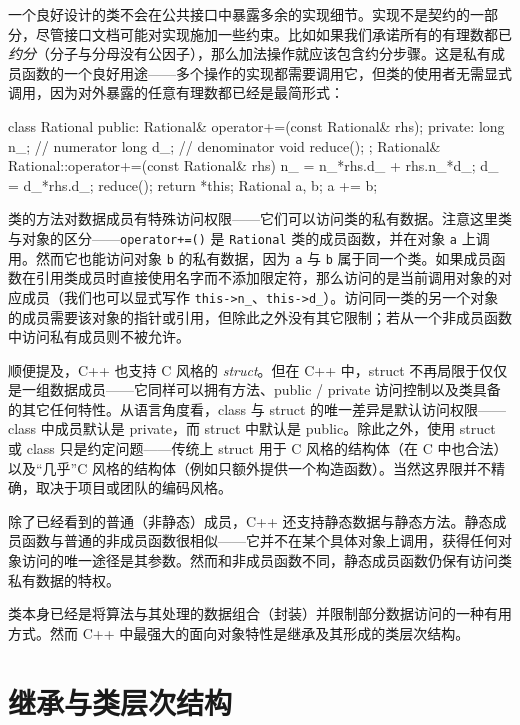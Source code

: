 一个良好设计的类不会在公共接口中暴露多余的实现细节。实现不是契约的一部分，尽管接口文档可能对实现施加一些约束。比如如果我们承诺所有的有理数都已\emph{约分}（分子与分母没有公因子），那么加法操作就应该包含约分步骤。这是私有成员函数的一个良好用途——多个操作的实现都需要调用它，但类的使用者无需显式调用，因为对外暴露的任意有理数都已经是最简形式：

\begin{code}
class Rational {
  public:
  Rational& operator+=(const Rational& rhs); private:
  long n_; // numerator
  long d_; // denominator
  void  reduce();
};
Rational& Rational::operator+=(const Rational& rhs) {
  n_ = n_*rhs.d_ + rhs.n_*d_;
  d_ = d_*rhs.d_; reduce();
  return *this;
}
Rational a, b; a += b;
\end{code}

类的方法对数据成员有特殊访问权限——它们可以访问类的私有数据。注意这里类与对象的区分——\texttt{operator+=()} 是 \texttt{Rational} 类的成员函数，并在对象 \texttt{a} 上调用。然而它也能访问对象 \texttt{b} 的私有数据，因为 \texttt{a} 与 \texttt{b} 属于同一个类。如果成员函数在引用类成员时直接使用名字而不添加限定符，那么访问的是当前调用对象的对应成员（我们也可以显式写作 \texttt{this-\textgreater{}n\_}、\texttt{this-\textgreater{}d\_}）。访问同一类的另一个对象的成员需要该对象的指针或引用，但除此之外没有其它限制；若从一个非成员函数中访问私有成员则不被允许。

顺便提及，C++ 也支持 C 风格的 \emph{struct}。但在 C++ 中，struct 不再局限于仅仅是一组数据成员——它同样可以拥有方法、public / private 访问控制以及类具备的其它任何特性。从语言角度看，class 与 struct 的唯一差异是默认访问权限——class 中成员默认是 private，而 struct 中默认是 public。除此之外，使用 struct 或 class 只是约定问题——传统上 struct 用于 C 风格的结构体（在 C 中也合法）以及“几乎”C 风格的结构体（例如只额外提供一个构造函数）。当然这界限并不精确，取决于项目或团队的编码风格。

除了已经看到的普通（非静态）成员，C++ 还支持静态数据与静态方法。静态成员函数与普通的非成员函数很相似——它并不在某个具体对象上调用，获得任何对象访问的唯一途径是其参数。然而和非成员函数不同，静态成员函数仍保有访问类私有数据的特权。

类本身已经是将算法与其处理的数据组合（封装）并限制部分数据访问的一种有用方式。然而 C++ 中最强大的面向对象特性是继承及其形成的类层次结构。

\section{继承与类层次结构}

